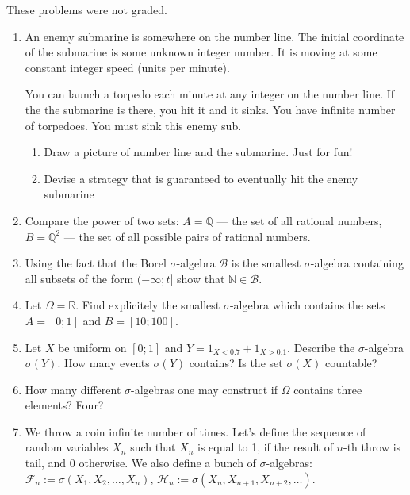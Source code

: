 \documentclass[12pt, a4paper]{article}
\begin{document}
These problems were not graded.

\begin{enumerate}
\item  An enemy submarine is somewhere on the number line. The initial coordinate of the submarine is some unknown integer number. It is moving at some constant integer speed (units per minute).

You can launch a torpedo each minute at any integer on the number line. If the the submarine is there, you hit it and it sinks. You have infinite number of torpedoes. You must sink this enemy sub.
\begin{enumerate}
\item Draw a picture of number line and the submarine. Just for fun!
\item Devise a strategy that is guaranteed to eventually hit the enemy submarine
\end{enumerate}

\item Compare the power of two sets: $A=\mathbb{Q}$ — the set of all rational numbers, $B=\mathbb{Q}^2$ — the set of all possible pairs of rational numbers.

\item Using the fact that the Borel $\sigma$-algebra $\mathcal{B}$ is the smallest $\sigma$-algebra containing all subsets of the form $(-\infty; t]$ show that $\mathbb{N}\in \mathcal{B}$.

\item Let $\Omega=\mathbb{R}$. Find explicitely the smallest $\sigma$-algebra which contains the sets $A=[0;1]$ and $B=[10;100]$.

\item Let $X$ be uniform on $[0;1]$ and $Y=1_{X<0.7}+1_{X>0.1}$. Describe the $\sigma$-algebra $\sigma(Y)$. How many events  $\sigma(Y)$ contains? Is the set $\sigma(X)$ countable?

\item How many different $\sigma$-algebras one may construct if $\Omega$ contains three elements? Four?

\item We throw a coin infinite number of times. Let's define the sequence of random variables $X_n$ such that  $X_{n}$ is equal to 1, if the result of $n$-th throw is tail, and 0 otherwise. We also define a bunch of $ \sigma $-algebras: $\mathcal{F}_{n}:=\sigma(X_{1}, X_{2}, \ldots, X_{n})$, $\mathcal{H}_{n}:=\sigma(X_{n},X_{n+1},X_{n+2},\ldots)$.


\end{enumerate}
\end{document}
